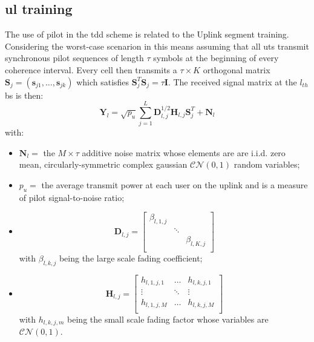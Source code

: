 \documentclass[11pt]{book}
\begin{document}
\subsection{\gls{ul} training}
The use of pilot in the \gls{tdd} scheme is related to the Uplink segment training. Considering the worst-case scenarion in this means assuming that all \gls{ut}s transmit synchronous pilot sequences of length $\tau$ symbols at the beginning of every coherence interval. Every cell then transmits a $\tau \times K$ orthogonal matrix $\textbf{S}_j = (\textbf{s}_{j1},\dots,\textbf{s}_{jk})$ which satisfies $\textbf{S}_j^T\textbf{S}_j = \tau \textbf{I}$. The received signal matrix at the $l_{th}$ \gls{bs} is then:
\begin{equation}
\textbf{Y}_l = \sqrt{p_u}\sum_{j=1}^{L}\textbf{D}_{l,j}^{1/2}\textbf{H}_{l,j}\textbf{S}_j^T + \textbf{N}_l
\label{eq:recSignal}
\end{equation}
with:
\begin{itemize}
  \item $\textbf{N}_l = $ the $M \times \tau$ additive noise matrix whose elements are are i.i.d. zero mean, circularly-symmetric complex gaussian $\mathcal{CN}(0,1)$ random variables;\\
  \item $p_u = $ the average transmit power at each user on the uplink and is a measure of pilot signal-to-noise ratio;\\
  \item
  \begin{equation}
    \textbf{D}_{l,j} =
    \begin{bmatrix}
      \beta_{l,1,j} &        &              \\
                    & \ddots &              \\
                    &        & \beta_{l,K,j}\\
    \end{bmatrix}
  \end{equation}
  with $\beta_{l,k,j}$ being the large scale fading coefficient;\\
  \item
  \begin{equation}
    \textbf{H}_{l,j} =
    \begin{bmatrix}
      h_{l,1,j,1} & \dots  & h_{l,k,j,1}\\
      \vdots      & \ddots & \vdots\\
      h_{l,1,j,M} & \dots & h_{l,k,j,M}\\
    \end{bmatrix}
  \end{equation}
  with $h_{l,k,j,m}$ being the small scale fading factor whose variables are $\mathcal{CN}(0,1)$.\\
\end{itemize}
\end{document}
